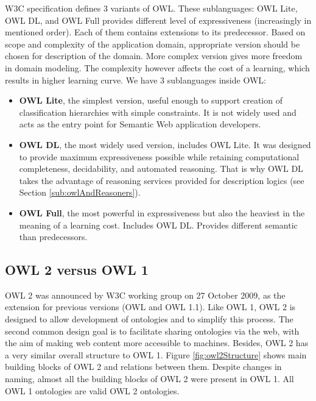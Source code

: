 W3C specification defines 3 variants of OWL. These sublanguages: OWL Lite, OWL DL, and OWL Full provides different level of expressiveness (increasingly in mentioned order). Each of them contains extensions to its predecessor. Based on scope and complexity of the application domain, appropriate version should be chosen for description of the domain. More complex version gives more freedom in domain modeling. The complexity however affects the cost of a learning, which results in higher learning curve. We have 3 sublanguages inside OWL:
\begin{itemize}
    \setlength{\itemsep}{0cm}
    \setlength{\parskip}{0cm}

    \item \textbf{OWL Lite}, the simplest version, useful enough to support creation of classification hierarchies with simple constraints. It is not widely used and acts as the entry point for Semantic Web application developers.
    \item \textbf{OWL DL}, the most widely used version, includes OWL Lite. It was designed to provide maximum expressiveness possible while retaining computational completeness, decidability, and automated reasoning. That is why OWL DL takes the advantage of reasoning services provided for description logics (see Section \ref{sub:owlAndReasoners}).
    \item \textbf{OWL Full}, the most powerful in expressiveness but also the heaviest in the meaning of a learning cost. Includes OWL DL. Provides different semantic than predecessors.
\end{itemize}

\subsection{OWL 2 versus OWL 1}
\label{sub:owl2vsowl1}

OWL 2 was announced by W3C working group on 27 October 2009, as the extension for previous versions (OWL and OWL 1.1). Like OWL 1, OWL 2 is designed to allow development of ontologies and to simplify this process. The second common design goal is to facilitate sharing ontologies via the web, with the aim of making web content more accessible to machines. Besides, OWL 2 has a very similar overall structure to OWL 1. Figure \ref{fig:owl2Structure} shows main building blocks of OWL 2 and relations between them. Despite changes in naming, almost all the building blocks of OWL 2 were present in OWL 1. All OWL 1 ontologies are valid OWL 2 ontologies.


